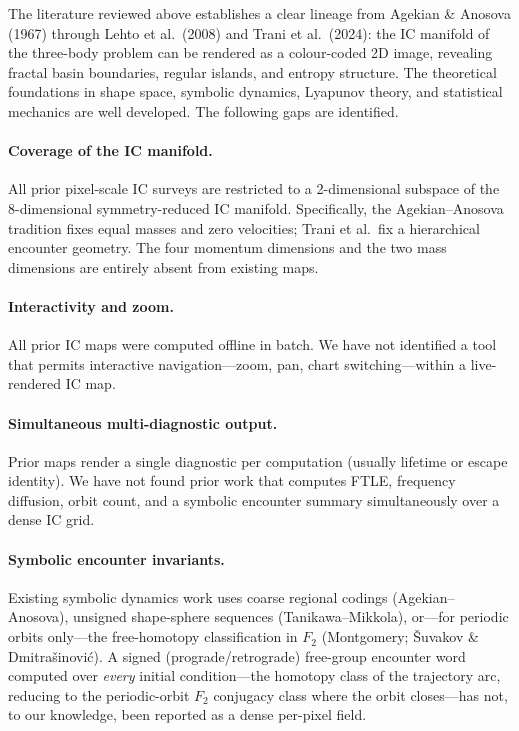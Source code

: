 \documentclass[11pt,a4paper]{article}
\begin{document}
The literature reviewed above establishes a clear lineage from Agekian \& Anosova (1967) through
Lehto et al.\ (2008) and Trani et al.\ (2024): the IC manifold of the three-body problem can be
rendered as a colour-coded 2D image, revealing fractal basin boundaries, regular islands, and
entropy structure.  The theoretical foundations in shape space, symbolic dynamics, Lyapunov
theory, and statistical mechanics are well developed.  The following gaps are identified.

\paragraph{Coverage of the IC manifold.}
All prior pixel-scale IC surveys are restricted to a 2-dimensional subspace of the
8-dimensional symmetry-reduced IC manifold.  Specifically, the Agekian--Anosova tradition fixes
equal masses and zero velocities; Trani et al.\ fix a hierarchical encounter geometry.  The four
momentum dimensions and the two mass dimensions are entirely absent from existing maps.

\paragraph{Interactivity and zoom.}
All prior IC maps were computed offline in batch.  We have not identified a tool that permits
interactive navigation---zoom, pan, chart switching---within a live-rendered IC map.

\paragraph{Simultaneous multi-diagnostic output.}
Prior maps render a single diagnostic per computation (usually lifetime or escape identity).
We have not found prior work that computes FTLE, frequency diffusion, orbit count, and a
symbolic encounter summary simultaneously over a dense IC grid.

\paragraph{Symbolic encounter invariants.}
Existing symbolic dynamics work uses coarse regional codings (Agekian--Anosova), unsigned
shape-sphere sequences (Tanikawa--Mikkola), or---for periodic orbits only---the free-homotopy
classification in $F_2$ (Montgomery; \v{S}uvakov \& Dmitra\v{s}inovi\'{c}).  A signed
(prograde/retrograde) free-group encounter word computed over \emph{every} initial
condition---the homotopy class of the trajectory arc, reducing to the periodic-orbit $F_2$
conjugacy class where the orbit closes---has not, to our knowledge, been reported as a dense
per-pixel field.
\end{document}

